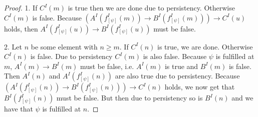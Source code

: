 \documentclass[runningheads]{llncs}
\begin{document}
\begin{proof}
	1. If $C^I(m)$ is true then we are done due to persistency. Otherwise $C^I(m)$ is false.
	Because $(A^I(f_{[\psi]}^I(m))\to B^I(f_{[\psi]}^I(m)))\to C^I(u)$ holds, then $A^I(f_{[\psi]}^I(u))\to B^I(f_{[\psi]}^I(u))$ must be false.
	
	
	2. Let $n$ be some element with $n\geq m$.
	If $C^I(n)$ is true, we are done.
	Otherwise $C^I(n)$ is false.
	Due to persistency $C^I(m)$ is also false.
	Because $\psi$ is fulfilled at $m$, $A^I(m)\to B^I(m)$ must be false, i.e. $A^I(m)$ is true and $B^I(m)$ is false. Then $A^I(n)$ and $A^I(f^I_{[\psi]}(n))$ are also true due to persistency.
	Because $(A^I(f^I_{[\psi]}(n))\to B^I(f^I_{[\psi]}(n)))\to C^I(n)$ holds, we now get that  $B^I(f^I_{[\psi]}(n))$ must be false.
	But then due to persistency so is $B^I(n)$ and we have that $\psi$ is fulfilled at $n$.
\end{proof}
\end{document}
